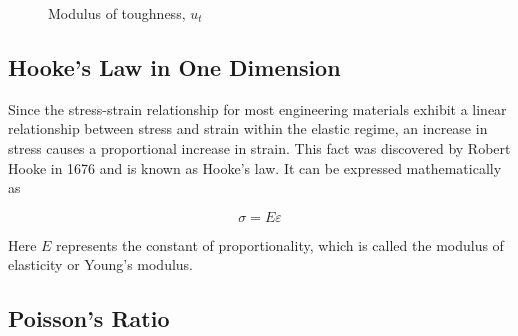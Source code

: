 \documentclass[
fontsize=10pt,
a4paper,
twosides=false,
open=any,
svgnames,
]{kaobook} %
\begin{document}
\begin{figure}[H]
  \centering
  \caption{Modulus of toughness, $u_t$}
  \label{fig: modulus of resilience}
\end{figure}

\subsection{Hooke’s Law in One Dimension}

Since the stress-strain relationship for most engineering materials exhibit a linear relationship between stress and strain within the elastic regime, an increase in stress causes a proportional increase in strain. This fact was discovered by Robert Hooke in 1676 and is known as Hooke’s law. It can be expressed mathematically as

\begin{equation}
  \sigma  = E\varepsilon
\end{equation}

Here $E$ represents the constant of proportionality, which is called the modulus of elasticity or Young’s modulus.

\subsection{Poisson’s Ratio}
\end{document}
